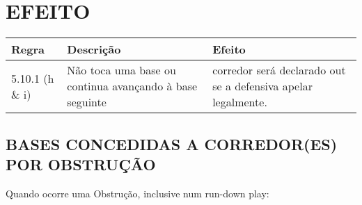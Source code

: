 \section*{EFEITO}

{\footnotesize\begin{tabular}{p{15mm}p{60mm}p{90mm}}
		Regra& Descrição & Efeito\\\hline
		5.10.1 (h \& i) & Não toca uma base ou continua avançando à base seguinte&corredor será declarado \gls{out} se a defensiva apelar legalmente.
\end{tabular}}

\subsection{BASES CONCEDIDAS A CORREDOR(ES) POR OBSTRUÇÃO}

Quando ocorre uma Obstrução, inclusive num \gls{run-down play}:

